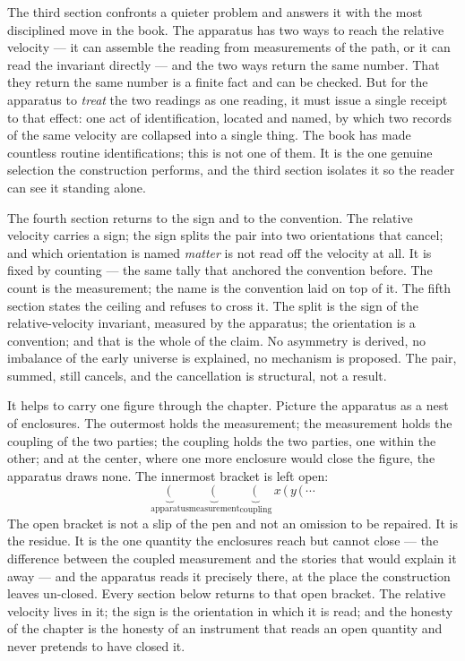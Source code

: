 The third section confronts a quieter problem and answers it with the most disciplined move
in the book. The apparatus has two ways to reach the relative velocity --- it can assemble
the reading from measurements of the path, or it can read the invariant directly --- and the
two ways return the same number. That they return the same number is a finite fact and can
be checked. But for the apparatus to \emph{treat} the two readings as one reading, it must
issue a single receipt to that effect: one act of identification, located and named, by
which two records of the same velocity are collapsed into a single thing. The book has made
countless routine identifications; this is not one of them. It is the one genuine selection
the construction performs, and the third section isolates it so the reader can see it
standing alone.

The fourth section returns to the sign and to the convention. The relative velocity carries
a sign; the sign splits the pair into two orientations that cancel; and which orientation is
named \emph{matter} is not read off the velocity at all. It is fixed by counting --- the same
tally that anchored the convention before. The count is the measurement; the name is the
convention laid on top of it. The fifth section states the ceiling and refuses to cross it.
The split is the sign of the relative-velocity invariant, measured by the apparatus; the
orientation is a convention; and that is the whole of the claim. No asymmetry is derived,
no imbalance of the early universe is explained, no mechanism is proposed. The pair, summed,
still cancels, and the cancellation is structural, not a result.

It helps to carry one figure through the chapter. Picture the apparatus as a nest of
enclosures. The outermost holds the measurement; the measurement holds the coupling of the
two parties; the coupling holds the two parties, one within the other; and at the center,
where one more enclosure would close the figure, the apparatus draws none. The innermost
bracket is left open:
\[
  \underbrace{\Big(\,}_{\text{apparatus}}
  \underbrace{\Big(\,}_{\text{measurement}}
  \underbrace{\big(\,}_{\text{coupling}}
  \,x\,\big(\,y\,\big(\,\cdots
\]
The open bracket is not a slip of the pen and not an omission to be repaired. It is the
residue. It is the one quantity the enclosures reach but cannot close --- the difference
between the coupled measurement and the stories that would explain it away --- and the
apparatus reads it precisely there, at the place the construction leaves un-closed. Every
section below returns to that open bracket. The relative velocity lives in it; the sign is
the orientation in which it is read; and the honesty of the chapter is the honesty of an
instrument that reads an open quantity and never pretends to have closed it.

